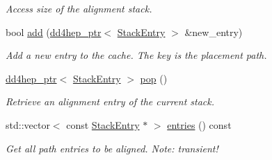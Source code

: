 \begin{DoxyCompactItemize}
\begin{DoxyCompactList}\small\item\em Access size of the alignment stack. \item\end{DoxyCompactList}\item 
bool \hyperlink{class_d_d4hep_1_1_alignments_1_1_alignment_stack_a16d69902ec4ebd8efe8c039d033f9e7b}{add} (\hyperlink{class_d_d4hep_1_1dd4hep__ptr}{dd4hep\_\-ptr}$<$ \hyperlink{struct_d_d4hep_1_1_alignments_1_1_alignment_stack_1_1_stack_entry}{StackEntry} $>$ \&new\_\-entry)
\begin{DoxyCompactList}\small\item\em Add a new entry to the cache. The key is the placement path. \item\end{DoxyCompactList}\item 
\hyperlink{class_d_d4hep_1_1dd4hep__ptr}{dd4hep\_\-ptr}$<$ \hyperlink{struct_d_d4hep_1_1_alignments_1_1_alignment_stack_1_1_stack_entry}{StackEntry} $>$ \hyperlink{class_d_d4hep_1_1_alignments_1_1_alignment_stack_aa140239531cbb98a7dde1d8af1f69877}{pop} ()
\begin{DoxyCompactList}\small\item\em Retrieve an alignment entry of the current stack. \item\end{DoxyCompactList}\item 
std::vector$<$ const \hyperlink{struct_d_d4hep_1_1_alignments_1_1_alignment_stack_1_1_stack_entry}{StackEntry} $\ast$ $>$ \hyperlink{class_d_d4hep_1_1_alignments_1_1_alignment_stack_abb950f98d95cf6c431ca7c8d3ca48fc0}{entries} () const 
\begin{DoxyCompactList}\small\item\em Get all path entries to be aligned. Note: transient! \item\end{DoxyCompactList}\end{DoxyCompactItemize}
